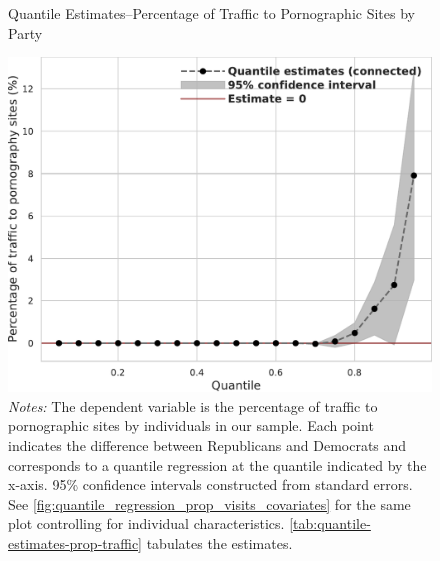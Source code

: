 \documentclass[12pt,twoside]{article}
\begin{document}
\begin{figure}
	\centering
	\caption{Quantile Estimates--Percentage of Traffic to Pornographic Sites by Party}
	\includegraphics[width=.55\linewidth]{figs/quantile_reg_proportion_visits_adult.pdf}
	\caption*{\footnotesize \emph{Notes:} 
		The dependent variable is the percentage of traffic to pornographic sites by individuals in our sample.
		Each point indicates the difference between Republicans and Democrats and corresponds to a quantile regression at the quantile indicated by the x-axis.
		95\% confidence intervals constructed from standard errors.
		See \cref{fig:quantile_regression_prop_visits_covariates} for the same plot controlling for individual characteristics.
            \cref{tab:quantile-estimates-prop-traffic} tabulates the estimates.
	}
	\label{fig:quantile_regression_prop_visits}
\end{figure}
\end{document}
